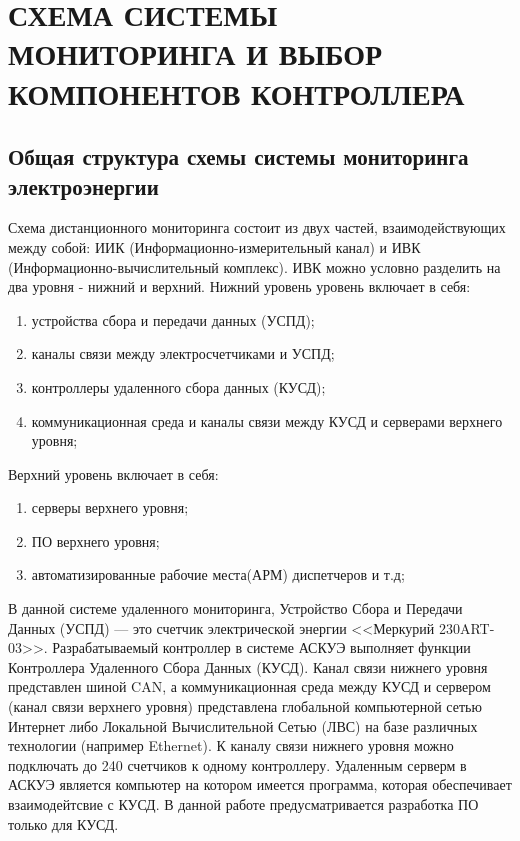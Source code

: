 \chapter{СХЕМА СИСТЕМЫ МОНИТОРИНГА И ВЫБОР КОМПОНЕНТОВ КОНТРОЛЛЕРА}

\section{Общая структура схемы системы мониторинга электроэнергии}

Схема дистанционного мониторинга состоит из двух частей, взаимодействующих между собой: ИИК (Информационно-измерительный канал) и ИВК (Информационно-вычислительный комплекс). ИВК можно условно разделить на два уровня - нижний и верхний. Нижний уровень уровень включает в себя:
\begin{enumerate}
	\item устройства сбора и передачи данных (УСПД);
	\item каналы связи между электросчетчиками и УСПД;
	\item контроллеры удаленного сбора данных (КУСД);
	\item коммуникационная среда и каналы связи между КУСД и серверами верхнего уровня;
\end{enumerate}

Верхний уровень включает в себя:
\begin{enumerate}
	\item серверы верхнего уровня;
	\item ПО верхнего уровня;
	\item автоматизированные рабочие места(АРМ) диспетчеров и т.д;
\end{enumerate}

В данной системе удаленного мониторинга, Устройство Сбора и Передачи Данных (УСПД) --- это счетчик электрической энергии <<Меркурий 230ART-03>>. Разрабатываемый контроллер в системе АСКУЭ выполняет функции Контроллера Удаленного Сбора Данных (КУСД). Канал связи нижнего уровня представлен шиной CAN, а коммуникационная среда между КУСД и сервером (канал связи верхнего уровня) представлена глобальной компьютерной сетью Интернет либо Локальной Вычислительной Сетью (ЛВС) на базе различных технологии (например Ethernet). К каналу связи нижнего уровня можно подключать до 240 счетчиков к одному контроллеру\cite{mercinfo1}. Удаленным серверм в АСКУЭ является компьютер на котором имеется программа, которая обеспечивает взаимодейтсвие с КУСД. В данной работе предусматривается разработка ПО только для КУСД.

